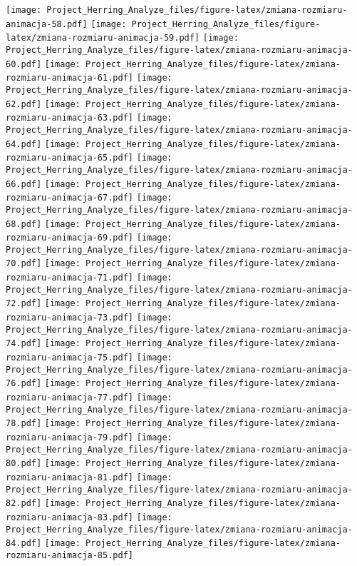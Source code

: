 \documentclass[]{article}
\begin{document}
\texttt{[image: Project\_Herring\_Analyze\_files/figure-latex/zmiana-rozmiaru-animacja-58.pdf]}
\texttt{[image: Project\_Herring\_Analyze\_files/figure-latex/zmiana-rozmiaru-animacja-59.pdf]}
\texttt{[image: Project\_Herring\_Analyze\_files/figure-latex/zmiana-rozmiaru-animacja-60.pdf]}
\texttt{[image: Project\_Herring\_Analyze\_files/figure-latex/zmiana-rozmiaru-animacja-61.pdf]}
\texttt{[image: Project\_Herring\_Analyze\_files/figure-latex/zmiana-rozmiaru-animacja-62.pdf]}
\texttt{[image: Project\_Herring\_Analyze\_files/figure-latex/zmiana-rozmiaru-animacja-63.pdf]}
\texttt{[image: Project\_Herring\_Analyze\_files/figure-latex/zmiana-rozmiaru-animacja-64.pdf]}
\texttt{[image: Project\_Herring\_Analyze\_files/figure-latex/zmiana-rozmiaru-animacja-65.pdf]}
\texttt{[image: Project\_Herring\_Analyze\_files/figure-latex/zmiana-rozmiaru-animacja-66.pdf]}
\texttt{[image: Project\_Herring\_Analyze\_files/figure-latex/zmiana-rozmiaru-animacja-67.pdf]}
\texttt{[image: Project\_Herring\_Analyze\_files/figure-latex/zmiana-rozmiaru-animacja-68.pdf]}
\texttt{[image: Project\_Herring\_Analyze\_files/figure-latex/zmiana-rozmiaru-animacja-69.pdf]}
\texttt{[image: Project\_Herring\_Analyze\_files/figure-latex/zmiana-rozmiaru-animacja-70.pdf]}
\texttt{[image: Project\_Herring\_Analyze\_files/figure-latex/zmiana-rozmiaru-animacja-71.pdf]}
\texttt{[image: Project\_Herring\_Analyze\_files/figure-latex/zmiana-rozmiaru-animacja-72.pdf]}
\texttt{[image: Project\_Herring\_Analyze\_files/figure-latex/zmiana-rozmiaru-animacja-73.pdf]}
\texttt{[image: Project\_Herring\_Analyze\_files/figure-latex/zmiana-rozmiaru-animacja-74.pdf]}
\texttt{[image: Project\_Herring\_Analyze\_files/figure-latex/zmiana-rozmiaru-animacja-75.pdf]}
\texttt{[image: Project\_Herring\_Analyze\_files/figure-latex/zmiana-rozmiaru-animacja-76.pdf]}
\texttt{[image: Project\_Herring\_Analyze\_files/figure-latex/zmiana-rozmiaru-animacja-77.pdf]}
\texttt{[image: Project\_Herring\_Analyze\_files/figure-latex/zmiana-rozmiaru-animacja-78.pdf]}
\texttt{[image: Project\_Herring\_Analyze\_files/figure-latex/zmiana-rozmiaru-animacja-79.pdf]}
\texttt{[image: Project\_Herring\_Analyze\_files/figure-latex/zmiana-rozmiaru-animacja-80.pdf]}
\texttt{[image: Project\_Herring\_Analyze\_files/figure-latex/zmiana-rozmiaru-animacja-81.pdf]}
\texttt{[image: Project\_Herring\_Analyze\_files/figure-latex/zmiana-rozmiaru-animacja-82.pdf]}
\texttt{[image: Project\_Herring\_Analyze\_files/figure-latex/zmiana-rozmiaru-animacja-83.pdf]}
\texttt{[image: Project\_Herring\_Analyze\_files/figure-latex/zmiana-rozmiaru-animacja-84.pdf]}
\texttt{[image: Project\_Herring\_Analyze\_files/figure-latex/zmiana-rozmiaru-animacja-85.pdf]}
\end{document}
